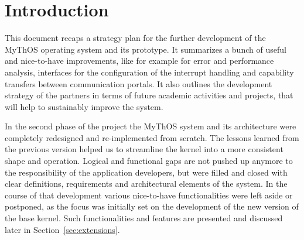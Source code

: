 % 
% 
% 

\section{Introduction}
\label{sec:intro}

This document recaps a strategy plan for the further development of the MyThOS
operating system and its prototype. It summarizes a bunch of useful and
nice-to-have improvements, like for example for error and performance analysis, interfaces
for the configuration of the interrupt handling and capability transfers
between communication portals. It also outlines the development strategy of the
partners in terms of future academic activities and projects, that will help to
sustainably improve the system.

In the second phase of the project the MyThOS system and its architecture were
completely redesigned and re-implemented from scratch. The lessons learned from
the previous version helped us to streamline the kernel into a more consistent
shape and operation. Logical and functional gaps are not pushed up anymore to
the responsibility of the application developers, but were filled and closed
with clear definitions, requirements and architectural elements of the system.
In the course of that development various nice-to-have functionalities were left
aside or postponed, as the focus was initially set on the development of the new
version of the base kernel. Such functionalities and features are presented and
discussed later in Section~\ref{sec:extensions}.

